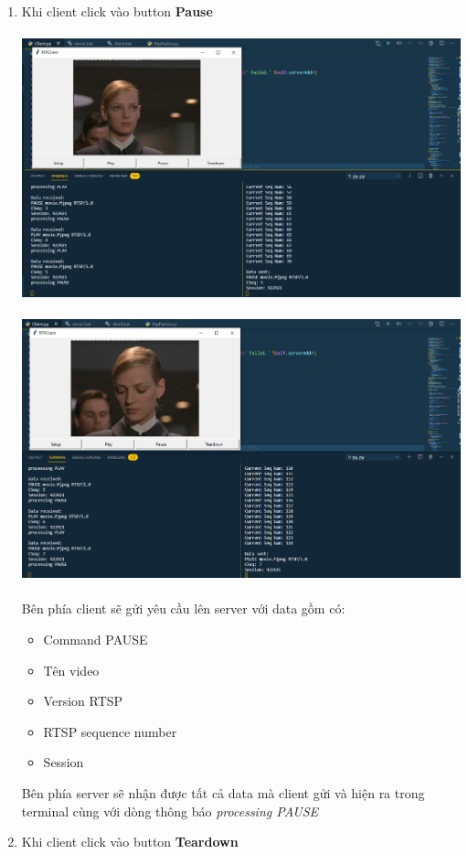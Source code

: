 \documentclass[12pt,a4paper]{article}
\begin{document}
\begin{enumerate}
\item Khi client click vào button \textbf{Pause} \\ \\
\includegraphics[scale=0.5]{h3.png}  \\ \\
\includegraphics[scale=0.5]{h4.png}  \\ \\
Bên phía client sẽ gửi yêu cầu lên server với data gồm có:
\begin{itemize}
\item Command PAUSE
\item Tên video
\item Version RTSP
\item RTSP sequence number
\item Session 
\end{itemize}
Bên phía server sẽ nhận được tất cả data mà client gửi và hiện ra trong terminal cùng với dòng thông báo  \textit{processing PAUSE}
\item Khi client click vào button \textbf{Teardown} \\ \\

\end{enumerate}
\end{document}
